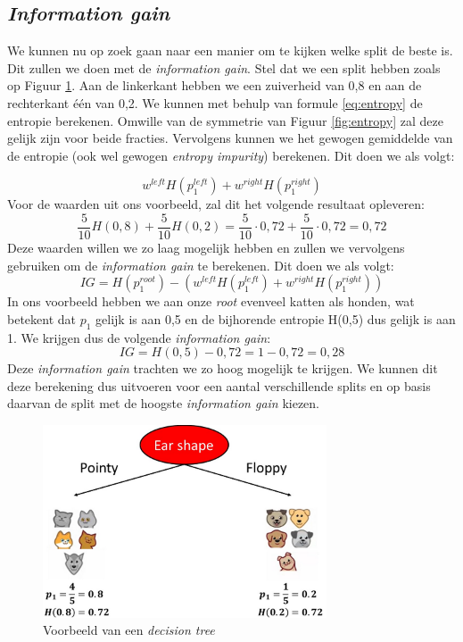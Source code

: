 \subsection{\textit{Information gain}}

We kunnen nu op zoek gaan naar een manier om te kijken welke split de beste is. Dit zullen we doen met de \textit{information gain}. Stel dat we een split hebben zoals op Figuur \ref{fig:decision-tree-split}. Aan de linkerkant hebben we een zuiverheid van 0,8 en aan de rechterkant één van 0,2. We kunnen met behulp van formule \ref{eq:entropy} de entropie berekenen. Omwille van de symmetrie van Figuur \ref{fig:entropy} zal deze gelijk zijn voor beide fracties. Vervolgens kunnen we het gewogen gemiddelde van de entropie (ook wel gewogen \textit{entropy impurity}) berekenen. Dit doen we als volgt:

\begin{equation}
	w^{left} H(p_{1}^{left}) + w^{right} H(p_{1}^{right})
\end{equation}
\noindent
Voor de waarden uit ons voorbeeld, zal dit het volgende resultaat opleveren:
\begin{equation}
	\frac{5}{10} H(0,8) + \frac{5}{10} H(0,2) = \frac{5}{10} \cdot 0,72+ \frac{5}{10} \cdot 0,72 = 0,72
\end{equation}
\noindent
Deze waarden willen we zo laag mogelijk hebben en zullen we vervolgens gebruiken om de \textit{information gain} te berekenen. Dit doen we als volgt:
\begin{equation}
	IG = H(p_{1}^{root}) - (w^{left} H(p_{1}^{left}) + w^{right} H(p_{1}^{right}))
\end{equation}
\noindent
In ons voorbeeld hebben we aan onze \textit{root} evenveel katten als honden, wat betekent dat $p_{1}$ gelijk is aan 0,5 en de bijhorende entropie H(0,5) dus gelijk is aan 1. We krijgen dus de volgende \textit{information gain}:
\begin{equation}
	IG = H(0,5) - 0,72 = 1 - 0,72 = 0,28
\end{equation}
\noindent
Deze \textit{information gain} trachten we zo hoog mogelijk te krijgen. We kunnen dit deze berekening dus uitvoeren voor een aantal verschillende splits en op basis daarvan de split met de hoogste \textit{information gain} kiezen. 

\begin{figure}[h]
	\centering
	\includegraphics[width=0.75\textwidth]{images/31-decision-tree-split.png}
	\caption{Voorbeeld van een \textit{decision tree}}
	\label{fig:decision-tree-split}
\end{figure}
\newpage
